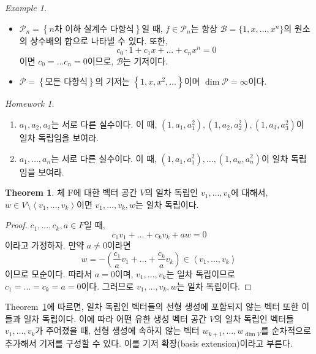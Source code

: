 \documentclass[unfonts,oneside,a4paper]{oblivoir}
\theoremstyle{definition}
\theoremstyle{theorem}
\newtheorem{theorem}{Theorem}
\theoremstyle{remark}
\theoremstyle{remark}
\theoremstyle{remark}
\newtheorem*{example}{Example}
\theoremstyle{remark}
\newtheorem*{homework}{Homework}
\renewcommand{\vec}[1]{\bm{\mathit{#1}}}
\newcommand{\vecz}{\bm{\mathrm{0}}}
\begin{document}
\begin{example}
    \leavevmode
    \begin{itemize}
        \item $\mathcal P_n = \left\{n\text{차 이하 실계수 다항식}\right\}$일 때, $f \in \mathcal P_n$는 항상 $\mathcal B = \{1, x, \dots, x^n\}$의 원소의 상수배의 합으로 나타낼 수 있다.
            또한,
            \[
                c_0 \cdot 1 + c_1 x + \dots + c_n x^n = 0
            \]
            이면 $c_0 = \dots c_n = 0$이므로, $\mathcal B$는 기저이다.
        \item $\mathcal P = \left\{\text{모든 다항식}\right\}$의 기저는 $\left\{1, x, x^2, \dots\right\}$이며 $\dim \mathcal{P} = \infty$이다.
    \end{itemize}
\end{example}

\begin{homework}
    \leavevmode
    \begin{enumerate}
        \item $a_1, a_2, a_3$는 서로 다른 실수이다.
            이 때, $\left(1, a_1, a_1^2\right), \left(1, a_2, a_2^2\right), \left(1, a_3, a_3^2\right)$이 일차 독립임을 보여라.
        \item $a_1, \dots, a_n$는 서로 다른 실수이다.
            이 때, $\left(1, a_1, a_1^2\right), \dots, \left(1, a_n, a_n^2\right)$이 일차 독립임을 보여라.
    \end{enumerate}
\end{homework}

\begin{theorem}\label{thm3}
    체 F에 대한 벡터 공간 $V$의 일차 독립인 $\vec v_1, \dots, \vec v_k$에 대해서, $\vec w \in V \setminus \left<\vec v_1 , \dots, \vec v_k\right>$이면 $\vec v_1, \dots, \vec v_k, \vec w$는 일차 독립이다.
\end{theorem}

\begin{proof}
    $c_1, \dots, c_k, a \in F$일 때,
    \[
        c_1 \vec v_1 + \dots + c_k \vec v_k + a \vec w = \vecz
    \]
    이라고 가정하자.
    만약 $a \neq 0$이라면 
    \[
        \vec w = -\left(\frac{c_1}{a} \vec v_1 + \dots + \frac{c_k}{a} \vec v_k\right) \in \left<\vec v_1, \dots, \vec v_k\right>
    \]
    이므로 모순이다.
    따라서 $a = 0$이며, $\vec v_1, \dots, \vec v_k$는 일차 독립이므로 $c_1 = \dots = c_k = a = 0$이다.
    그러므로 $\vec v_1, \dots, \vec v_k, \vec w$는 일차 독립이다.
\end{proof}

Theorem~\ref{thm3}에 따르면, 일차 독립인 벡터들의 선형 생성에 포함되지 않는 벡터 또한 이들과 일차 독립이다.
이에 따라 어떤 유한 생성 벡터 공간 $V$의 일차 독립인 벡터들 $\vec v_1, \dots, \vec v_k$가 주어졌을 때, 선형 생성에 속하지 않는 벡터 $\vec w_{k + 1}, \dots, \vec w_{\dim V}$를 순차적으로 추가해서 기저를 구성할 수 있다.
이를 기저 확장(basis extension)이라고 부른다.
\end{document}
